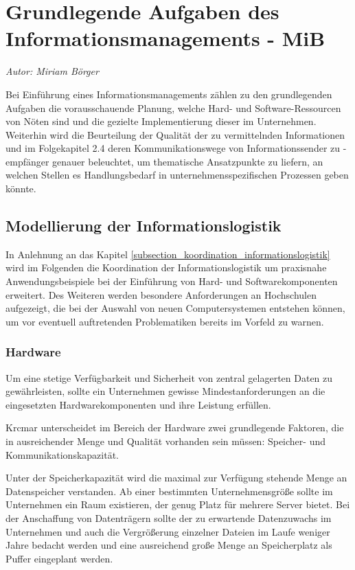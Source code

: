 \section{Grundlegende Aufgaben des Informationsmanagements - MiB}
\textit{Autor: Miriam Börger}

Bei Einführung eines Informationsmanagements zählen zu den grundlegenden Aufgaben die 
vorausschauende Planung, welche Hard- und Software-Ressourcen von Nöten sind und die 
gezielte Implementierung dieser im Unternehmen. Weiterhin wird die Beurteilung der Qualität 
der zu vermittelnden Informationen und im Folgekapitel 2.4 deren Kommunikationswege von 
Informationssender zu -empfänger genauer beleuchtet, um thematische Ansatzpunkte zu 
liefern, an welchen Stellen es Handlungsbedarf in unternehmensspezifischen Prozessen 
geben könnte. 

\subsection{Modellierung der Informationslogistik}
In Anlehnung an das Kapitel \ref{subsection_koordination_informationslogistik} wird im Folgenden die Koordination der 
Informationslogistik um praxisnahe Anwendungsbeispiele bei der Einführung von Hard- und 
Softwarekomponenten erweitert. Des Weiteren werden besondere Anforderungen an 
Hochschulen aufgezeigt, die bei der Auswahl von neuen Computersystemen entstehen können, 
um vor eventuell auftretenden Problematiken bereits im Vorfeld zu warnen.

\subsubsection{Hardware}
Um eine stetige Verfügbarkeit und Sicherheit von zentral gelagerten Daten zu gewährleisten, 
sollte ein Unternehmen gewisse Mindestanforderungen an die eingesetzten Hardwarekomponenten 
und ihre Leistung erfüllen. 

Krcmar unterscheidet im Bereich der Hardware zwei grundlegende Faktoren, die in ausreichender 
Menge und Qualität vorhanden sein müssen: Speicher- und Kommunikationskapazität. 

Unter der Speicherkapazität wird die maximal zur Verfügung stehende Menge an Datenspeicher verstanden. 
Ab einer bestimmten Unternehmensgröße sollte im Unternehmen ein Raum existieren, der genug Platz 
für mehrere Server bietet. Bei der Anschaffung von Datenträgern sollte der zu erwartende 
Datenzuwachs im Unternehmen und auch die Vergrößerung einzelner Dateien im Laufe weniger Jahre 
bedacht werden und eine ausreichend große Menge an Speicherplatz als Puffer eingeplant werden. 

